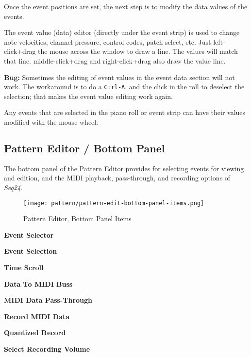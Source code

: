    Once the event positions are set, the next step is to modify the
   data values of the events.

	The event value (data) editor (directly under the event strip) is used 
	to change note velocities, channel pressure, control codes,
	patch select, etc.
   Just left-click+drag the mouse across the window to draw a line.  The
   values will match that line.  
   middle-click+drag and right-click+drag also
   draw the value line.

   \textbf{Bug:}
   Sometimes the editing of event values in the event data section will not work.
   The workaround is to do a \texttt{Ctrl-A}, and the click in the roll
   to deselect the selection; that makes the event value editing work again.
   
   Any events that are selected in the piano roll or event strip can have
   their values modified with the mouse wheel.

\subsection{Pattern Editor / Bottom Panel}
\label{subsec:seq24_pattern_editor_bottom}

   The bottom panel of the Pattern Editor provides for selecting events for
   viewing and edition, and the MIDI playback, pass-through, and recording
   options of \textsl{Seq24}.

\begin{figure}[H]
   \centering 
   \texttt{[image: pattern/pattern-edit-bottom-panel-items.png]}
   \caption{Pattern Editor, Bottom Panel Items}
   \label{fig:pattern_editor_bottom_panel_items}
\end{figure}

   \begin{enumber}
      \item \textbf{Event Selector}
      \item \textbf{Event Selection}
      \item \textbf{Time Scroll}
      \item \textbf{Data To MIDI Buss}
      \item \textbf{MIDI Data Pass-Through}
      \item \textbf{Record MIDI Data}
      \item \textbf{Quantized Record}
      \item \textbf{Select Recording Volume}
   \end{enumber}

